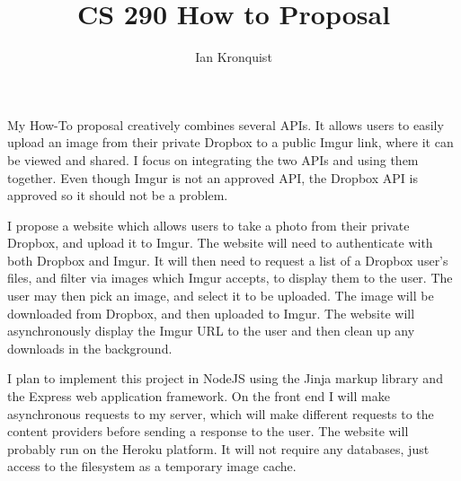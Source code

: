 \documentclass[12pt]{article}
\title{CS 290 How to Proposal}
\author{Ian Kronquist}
\begin{document}
\maketitle

My How-To proposal creatively combines several APIs. It allows users to easily upload an image from their private Dropbox to a public Imgur link, where it can be viewed and shared. I focus on integrating the two APIs and using them together. Even though Imgur is not an approved API, the Dropbox API is approved so it should not be a problem.

I propose a website which allows users to take a photo from their private Dropbox, and upload it to Imgur. The website will need to authenticate with both Dropbox and Imgur. It will then need to request a list of a Dropbox user's files, and filter via images which Imgur accepts, to display them to the user. The user may then pick an image, and select it to be uploaded. The image will be downloaded from Dropbox, and then uploaded to Imgur. The website will asynchronously display the Imgur URL to the user and then clean up any downloads in the background.

I plan to implement this project in NodeJS using the Jinja markup library and the Express web application framework. On the front end I will make asynchronous requests to my server, which will make different requests to the content providers before sending a response to the user. The website will probably run on the Heroku platform. It will not require any databases, just access to the filesystem as a temporary image cache.
\end{document}
